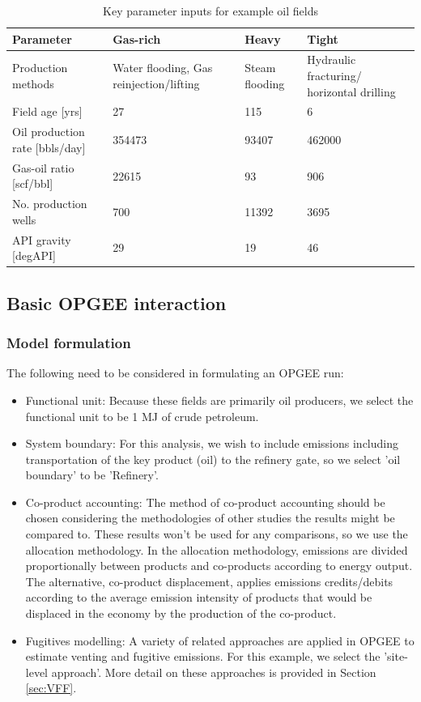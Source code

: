 \documentclass[11pt]{report}
\begin{document}
\begin{table}[h]
\begin{scriptsize}
\caption{Key parameter inputs for example oil fields}
\label{tab:example_parameters}
\begin{tabular*}{1\columnwidth}{p{}p{}p{}p{}}
\toprule
Parameter & Gas-rich & Heavy & Tight \\
\midrule
Production methods & Water flooding, Gas reinjection/lifting & Steam flooding & Hydraulic fracturing/ horizontal drilling \\
Field age [yrs] & 27 & 115 & 6 \\
Oil production rate [bbls/day] & 354473 & 93407 & 462000 \\
Gas-oil ratio [scf/bbl] & 22615 & 93 & 906 \\
No. production wells & 700 & 11392 & 3695 \\
API gravity [degAPI] & 29 & 19 & 46 \\
\bottomrule
\end{tabular*}
\end{scriptsize}
\end{table}

\subsection{Basic OPGEE interaction} 

\subsubsection{Model formulation}

The following need to be considered in formulating an OPGEE run:

\begin{itemize}
\item Functional unit: Because these fields are primarily oil producers, we select the functional unit to be 1 MJ of crude petroleum.
\item System boundary: For this analysis, we wish to include emissions including transportation of the key product (oil) to the refinery gate, so we select 'oil boundary' to be 'Refinery'.
\item Co-product accounting: The method of co-product accounting should be chosen considering the methodologies of other studies the results might be compared to. These results won't be used for any comparisons, so we use the allocation methodology. In the allocation methodology, emissions are divided proportionally between products and co-products according to energy output. The alternative, co-product displacement, applies emissions credits/debits according to the average emission intensity of products that would be displaced in the economy by the production of the co-product.
\item Fugitives modelling: A variety of related approaches are applied in OPGEE to estimate venting and fugitive emissions. For this example, we select the 'site-level approach'. More detail on these approaches is provided in Section \ref{sec:VFF}.
\end{itemize}
\end{document}
